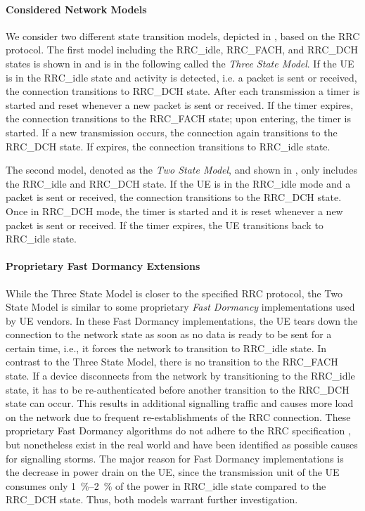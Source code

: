 \paragraph*{Considered Network Models} We consider two different state transition models, depicted in , based on the \gls{RRC} protocol.
The first model including the \gls{RRC_idle}, \gls{RRC_FACH}, and \gls{RRC_DCH} states is shown in  and is in the following called the \emph{Three State Model}.
If the \gls{UE} is in the \gls{RRC_idle} state and activity is detected, i.e. a packet is sent or received, the connection transitions to \gls{RRC_DCH} state.
After each transmission a timer \TDCH is started and reset whenever a new packet is sent or received.
If the timer expires, the connection transitions to the \gls{RRC_FACH} state; upon entering, the \TFACH timer is started.
If a new transmission occurs, the connection again transitions to the \gls{RRC_DCH} state.
If \TFACH expires, the connection transitions to \gls{RRC_idle} state.

The second model, denoted as the \emph{Two State Model}, and shown in , only includes the \gls{RRC_idle} and \gls{RRC_DCH} state.
If the \gls{UE} is in the \gls{RRC_idle} mode and a packet is sent or received, the connection transitions to the \gls{RRC_DCH} state. Once in \gls{RRC_DCH} mode, the \TDCH timer is started and it is reset whenever a new packet is sent or received.
If the timer expires, the \gls{UE} transitions back to \gls{RRC_idle} state.

\paragraph*{Proprietary Fast Dormancy Extensions} While the Three State Model is closer to the specified \gls{RRC} protocol, the Two State Model is similar to some proprietary \emph{Fast Dormancy} implementations used by \gls{UE} vendors.
In these Fast Dormancy implementations, the \gls{UE} tears down the connection to the network state as soon as no data is ready to be sent for a certain time, i.e., it forces the network to transition to \gls{RRC_idle} state.
In contrast to the Three State Model, there is no transition to the \gls{RRC_FACH} state.
If a device disconnects from the network by transitioning to the \gls{RRC_idle} state, it has to be re-authenticated before another transition to the \gls{RRC_DCH} state can occur.
This results in additional signalling traffic and causes more load on the network \cite{NSN2011} due to frequent re-establishments of the RRC connection.
These proprietary Fast Dormancy algorithms do not adhere to the \gls{RRC} specification \cite{GSM2010}, but nonetheless exist in the real world and have been identified as possible causes for signalling storms.
The major reason for Fast Dormancy implementations is the decrease in power drain on the \gls{UE}, since the transmission unit of the \gls{UE} consumes only \SIrange{1}{2}{\percent} of the power in \gls{RRC_idle} state compared to the \gls{RRC_DCH} state.
Thus, both models warrant further investigation.

